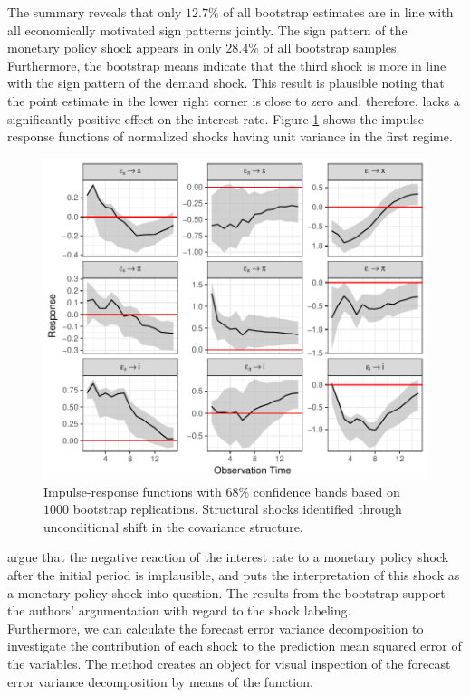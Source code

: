 \documentclass[nojss]{jss}\usepackage[]{graphicx}\usepackage[]{color}
\begin{document}
The summary reveals that only $12.7\%$ of all bootstrap estimates are in line with all economically motivated sign patterns jointly. The sign pattern of the monetary policy shock appears in only $28.4\%$ of all bootstrap samples. Furthermore, the bootstrap means indicate that the third shock is more in line with the sign pattern of the demand shock. This result is plausible noting that the point estimate in the lower right corner is close to zero and, therefore, lacks a significantly positive effect on the interest rate. Figure \ref{fig:irf_cv} shows the impulse-response functions of normalized shocks having unit variance in the first regime.
\begin{figure}[h]
\center
\includegraphics[scale=1]{Figures/IRF_cv}
\caption{Impulse-response functions with $68\%$ confidence bands based on $1000$ bootstrap replications. Structural shocks identified through unconditional shift in the covariance structure.}
\label{fig:irf_cv}
\end{figure}
\cite{HerwartzPloedt2016} argue that the negative reaction of the interest rate to a monetary policy shock after the initial period is implausible, and puts the interpretation of this shock as a monetary policy shock into question. The results from the bootstrap support the authors' argumentation with regard to the shock labeling. \\
Furthermore, we can calculate the forecast error variance decomposition to investigate the contribution of each shock to the prediction mean squared error of the variables. The  method creates an object for visual inspection of the forecast error variance decomposition by means of the  function.
\end{document}
